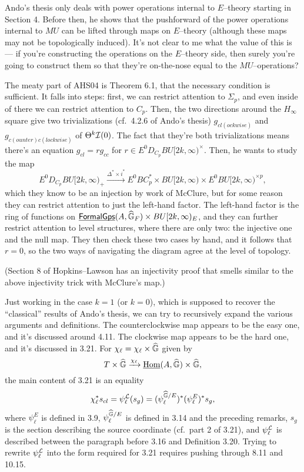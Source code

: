 Ando's thesis only deals with power operations internal to $E$--theory starting in Section 4.  Before then, he shows that the pushforward of the power operations internal to $MU$ can be lifted through maps on $E$--theory (although these maps may not be topologically induced).  It's not clear to me what the value of this is --- if you're constructing the operations on the $E$--theory side, then surely you're going to construct them so that they're on-the-nose equal to the $MU$--operations?

The meaty part of AHS04 is Theorem 6.1, that the necessary condition is sufficient.  It falls into steps: first, we can restrict attention to $\Sigma_p$, and even inside of there we can restrict attention to $C_p$.  Then, the two directions around the $H_\infty$ square give two trivializations (cf.\ 4.2.6 of Ando's thesis) $g_{cl(ockwise)}$ and $g_{c(ounter)c(lockwise)}$ of $\Theta^k \mathcal{I}(0)$.  The fact that they're both trivializations means there's an equation $g_{cl} = r g_{cc}$ for $r \in E^0 D_{C_p} BU[2k, \infty)^\times$.  Then, he wants to study the map \[E^0 D_{C_p} BU[2k, \infty)_+ \xrightarrow{\Delta^* \times i^*} E^0 BC_p^* \times BU[2k, \infty) \times E^0 BU[2k, \infty)^{\times p},\] which they know to be an injection by work of McClure, but for some reason they can restrict attention to just the left-hand factor.  The left-hand factor is the ring of functions on $\operatorname{\underline{\smash{\mathsf{FormalGps}}}}(A, \widehat{\mathbb G}_F) \times BU[2k, \infty)_E$, and they can further restrict attention to level structures, where there are only two: the injective one and the null map.  They then check these two cases by hand, and it follows that $r = 0$, so the two ways of navigating the diagram agree at the level of topology.

(Section 8 of Hopkins--Lawson has an injectivity proof that smells similar to the above injectivity trick with McClure's map.)

Just working in the case $k = 1$ (or $k = 0$), which is supposed to recover the ``classical'' results of Ando's thesis, we can try to recursively expand the various arguments and definitions.  The counterclockwise map appears to be the easy one, and it's discussed around 4.11.  The clockwise map appears to be the hard one, and it's discussed in 3.21.  For $\chi_\ell = \chi_\ell \times \widehat{\mathbb G}$ given by \[T \times \widehat{\mathbb G} \xrightarrow{\chi_\ell} \underline{\operatorname{Hom}}(A, \widehat{\mathbb G}) \times \widehat{\mathbb G},\] the main content of 3.21 is an equality \[\chi_\ell^* s_{cl} = \psi_\ell^{\mathcal{L}}(s_g) = (\psi_\ell^{\widehat{\mathbb G}/E})^* (\psi_\ell^E)^* s_g,\] where $\psi_\ell^E$ is defined in 3.9, $\psi_\ell^{\widehat{\mathbb G}/E}$ is defined in 3.14 and the preceding remarks, $s_g$ is the section describing the source coordinate (cf.\ part 2 of 3.21), and $\psi_\ell^{\mathcal{L}}$ is described between the paragraph before 3.16 and Definition 3.20.  Trying to rewrite $\psi_\ell^{\mathcal{L}}$ into the form required for 3.21 requires pushing through 8.11 and 10.15.

